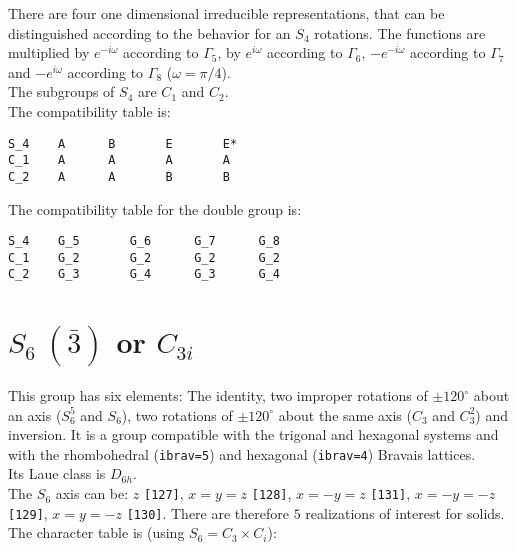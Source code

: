 \documentclass[12pt,a4paper,twoside]{report}
\begin{document}
There are four one dimensional irreducible representations, that can
be distinguished according to the behavior for an $S_4$ rotations.
The functions are multiplied by $e^{-i\omega}$ according to $\Gamma_5$,
by $e^{i\omega}$ according to $\Gamma_6$, $-e^{-i\omega}$ according to
$\Gamma_7$ and $-e^{i\omega}$ according to $\Gamma_8$ ($\omega=\pi/4$). \\
The subgroups of $S_4$ are $C_1$ and $C_2$. \\
The compatibility table is:

\begin{tcolorbox}
\begin{footnotesize}
\begin{verbatim}
S_4    A      B       E       E*  
C_1    A      A       A       A
C_2    A      A       B       B
\end{verbatim}
\end{footnotesize}
\end{tcolorbox}

The compatibility table for the double group is:

\begin{tcolorbox}
\begin{footnotesize}
\begin{verbatim}
S_4    G_5       G_6      G_7      G_8 
C_1    G_2       G_2      G_2      G_2
C_2    G_3       G_4      G_3      G_4
\end{verbatim}
\end{footnotesize}
\end{tcolorbox}

\newpage
{\color{coral}\section{$S_6\ (\bar 3)$ or $C_{3i}$}}  
\color{black}
This group has six elements: The identity, two improper rotations 
of $\pm120^\circ$ about an axis ($S_6^5$ and $S_6$), two rotations of 
$\pm120^\circ$ about the same axis ($C_3$ and $C_3^2$) and inversion.
It is a group compatible with the trigonal and hexagonal systems and with the  
rhombohedral (\texttt{ibrav=5}) and hexagonal (\texttt{ibrav=4}) Bravais lattices. \\
Its Laue class is $D_{6h}$. \\
The $S_6$ axis can be: $z$ \texttt{[127]}, $x=y=z$ \texttt{[128]}, 
$x=-y=z$ \texttt{[131]}, $x=-y=-z$ \texttt{[129]}, $x=y=-z$ \texttt{[130]}.
There are therefore $5$ realizations of interest for solids. \\
The character table is (using $S_6=C_3 \times C_i$):
\end{document}
